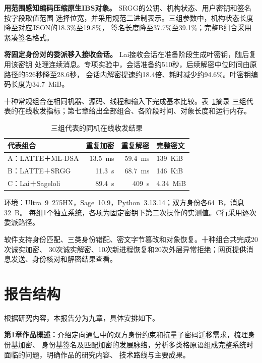 \textbf{用范围感知编码压缩原生IBS对象。} SRGG的公钥、机构状态、用户密钥和签名按字段取值范围
选择位宽，并采用规范二进制表示。三组参数中，机构状态长度降至对应JSON的18.3\%至19.8\%，
签名长度降至37.7\%至39.1\%；完整B组合采用紧凑签名格式。

\textbf{将固定身份对的委派移入接收会话。} Lai接收会话在准备阶段生成叶密钥，随后复用该密钥
处理连续消息。专项实验中，会话准备约510秒，后续解密中位时间由原路径的526秒降至28.6秒，
会话内解密提速约18.4倍、耗时减少约94.6\%。叶密钥编码长度为34.7~MiB。

十种常规组合在相同机器、源码、线程和输入下完成基本比较。表~\ref{tab:work-highlights}摘录
三组代表的在线收发指标；第七章给出全部组合、各阶段时间、对象长度和运行内存。

\begin{table}[H]
\centering\small
\caption{三组代表的同机在线收发结果}
\label{tab:work-highlights}
\begin{tabularx}{\textwidth}{@{}p{}rrX@{}}
\toprule
\rowcolor{black!8} 代表组合 & 重复加密 & 重复解密 & 完整密文 \\
\midrule
A：LATTE＋ML-DSA & 13.5~ms & 59.4~ms & 139~KiB \\
B：LATTE＋SRGG & 11.3~s & 68.7~ms & 146~KiB \\
C：Lai＋Sageloli & 89.4~s & 409~s & 4.34~MiB \\
\bottomrule
\end{tabularx}
\begin{minipage}{.98\textwidth}\footnotesize
环境：Ultra~9~275HX，Sage~10.9，Python~3.13.14；双方身份各64~B，消息32~B。
每组1个独立系统，各项为固定密钥下第二次操作的实测值。C行采用逐次委派路径。
\end{minipage}
\end{table}

软件支持身份匹配、三类身份错配、密文字节篡改和对象恢复。十种组合共完成20次诚实加密、
30次诚实解密、10次新进程恢复和20次外层异常拒绝；网页提供消息发送、身份核对和解密结果查看。


\clearpage
\section{报告结构}

根据研究内容，本报告分为九章，具体安排如下。

\textbf{第1章\quad 作品概述：}介绍定向通信中的双方身份约束和抗量子密码迁移需求，梳理身份基加密、
身份基签名及匹配加密的发展脉络，分析多类格原语组成完整系统时面临的问题，明确作品的研究内容、
技术路线与主要成果。

